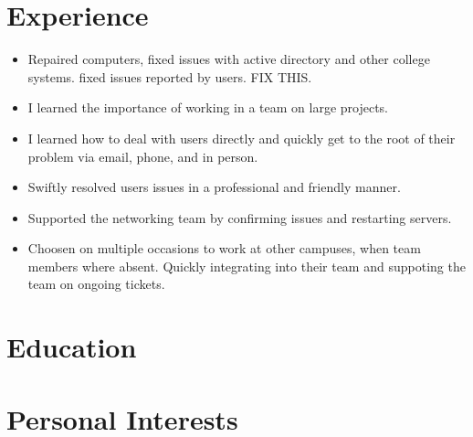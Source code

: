 \documentclass[a4paper]{cv}
\begin{document}
\hspace{0.2cm}
\begin{minipage}[t]{0.66\textwidth}
\section{Experience}
\begin{itemize}
    \item Repaired computers, fixed issues with active directory and other college systems. fixed issues reported by users. FIX THIS.
    \item I learned the importance of working in a team on large projects.
    \item I learned how to deal with users directly and quickly get to the root of their problem via email, phone, and in person.
    \item Swiftly resolved users issues in a professional and friendly manner.
    \item Supported the networking team by confirming issues and restarting servers.
    \item Choosen on multiple occasions to work at other campuses, when team members where absent. Quickly integrating into their team and suppoting the team on ongoing tickets.
\end{itemize}
\section{Education}
\sectionspace

\sectionspace

 
\section{Personal Interests}

\end{minipage}
\end{document}
